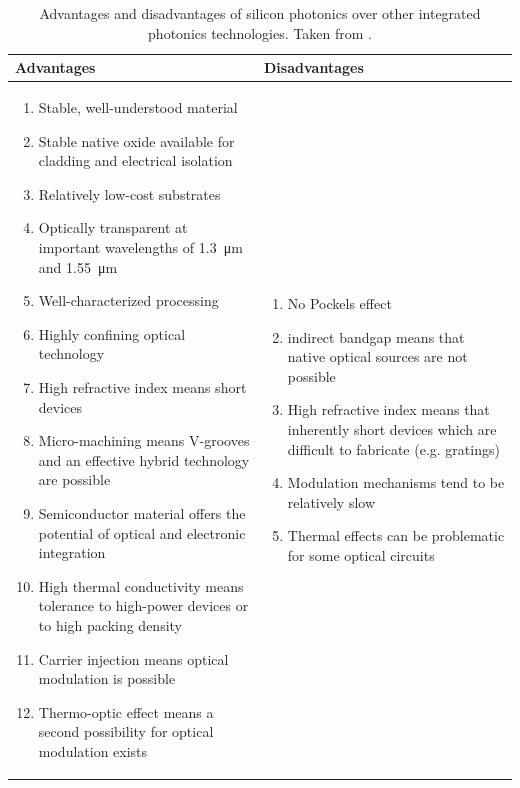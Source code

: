 \begin{table}[!htbp]
	\centering
	\footnotesize
	\begin{tabular}{p{} p{}}
	\toprule
	\normalsize Advantages & \normalsize Disadvantages \\ 
	\midrule
	\begin{enumerate}[ label={\roman*.}, noitemsep ]
		\item Stable, well-understood material
		\item Stable native oxide available for cladding and electrical isolation
		\item Relatively low-cost substrates
		\item Optically transparent at important wavelengths of \SI{1.3}{\um} and \SI{1.55}{\um}
		\item Well-characterized processing
		\item Highly confining optical technology
		\item High refractive index means short devices
		\item Micro-machining means V-grooves and an effective hybrid technology are possible
		\item Semiconductor material offers the potential of optical and electronic integration
		\item High thermal conductivity means tolerance to high-power devices or to high packing density
		\item Carrier injection means optical modulation is possible
		\item Thermo-optic effect means a second possibility for optical modulation exists
	\end{enumerate}
	&
	\begin{enumerate}[ label={\roman*.}, noitemsep]
		\item No Pockels effect
		\item indirect bandgap means that native optical sources are not possible
		\item High refractive index means that inherently short devices which are difficult to fabricate (e.g. gratings)
		\item Modulation mechanisms tend to be relatively slow
		\item Thermal effects can be problematic for some optical circuits
	\end{enumerate}
	\\	
	\bottomrule
	\end{tabular}
	
	\caption{Advantages and disadvantages of silicon photonics over other integrated photonics technologies. Taken from \cite{Reed2008}.}
	\label{tab:silicon_adv_and_disadv}
\end{table}

